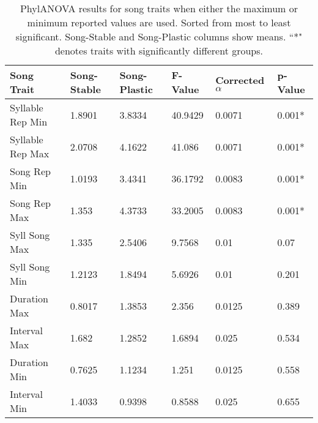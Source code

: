 \documentclass[a4paper,12pt]{article}
\begin{document}
\beginsupplement
\setcounter{page}{13}





\begin{table}[ht]
\caption{PhylANOVA results for song traits when either the maximum or minimum reported values are used.  Sorted from most to least significant.  Song-Stable and Song-Plastic columns show means.  ``*" denotes traits with significantly different groups.}
\centering
\begin{tabular}{llllll}
  \hline
Song Trait & Song-Stable & Song-Plastic & F-Value & Corrected $\alpha$ & p-Value \\ 
  \hline
Syllable Rep Min & 1.8901 & 3.8334 & 40.9429 & 0.0071 & 0.001* \\ 
  Syllable Rep Max & 2.0708 & 4.1622 & 41.086 & 0.0071 & 0.001* \\ 
  Song Rep Min & 1.0193 & 3.4341 & 36.1792 & 0.0083 & 0.001* \\ 
  Song Rep Max & 1.353 & 4.3733 & 33.2005 & 0.0083 & 0.001* \\ 
  Syll Song Max & 1.335 & 2.5406 & 9.7568 & 0.01 & 0.07 \\ 
  Syll Song Min & 1.2123 & 1.8494 & 5.6926 & 0.01 & 0.201 \\ 
  Duration Max & 0.8017 & 1.3853 & 2.356 & 0.0125 & 0.389 \\ 
  Interval Max & 1.682 & 1.2852 & 1.6894 & 0.025 & 0.534 \\ 
  Duration Min & 0.7625 & 1.1234 & 1.251 & 0.0125 & 0.558 \\ 
  Interval Min & 1.4033 & 0.9398 & 0.8588 & 0.025 & 0.655 \\ 
   \hline
\end{tabular}
\end{table}
\end{document}

